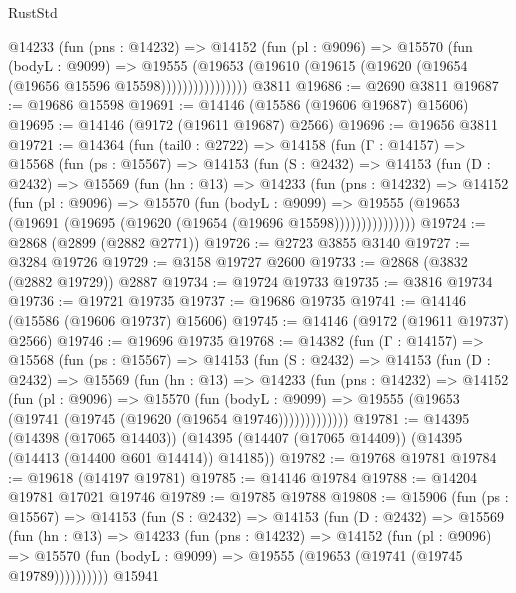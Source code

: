 \begin{lexlean}{RustStd}
\begin{coremodule}
                @14233
                  (fun (pns : @14232) =>
                  @14152
                    (fun (pl : @9096) =>
                    @15570
                      (fun (bodyL : @9099) =>
                      @19555
                        (@19653
                          (@19610 (@19615 (@19620 (@19654 (@19656 @15596 @15598))))))))))))))))
    @3811
@19686 := @2690 @3811
@19687 := @19686 @15598
@19691 := @14146 (@15586 (@19606 @19687) @15606)
@19695 := @14146 (@9172 (@19611 @19687) @2566)
@19696 := @19656 @3811
@19721 := @14364
    (fun (tail0 : @2722) =>
    @14158
      (fun (Γ : @14157) =>
      @15568
        (fun (ps : @15567) =>
        @14153
          (fun (S : @2432) =>
          @14153
            (fun (D : @2432) =>
            @15569
              (fun (hn : @13) =>
              @14233
                (fun (pns : @14232) =>
                @14152
                  (fun (pl : @9096) =>
                  @15570
                    (fun (bodyL : @9099) =>
                    @19555 (@19653 (@19691 (@19695 (@19620 (@19654 (@19696 @15598)))))))))))))))
@19724 := @2868 (@2899 (@2882 @2771))
@19726 := @2723 @3855 @3140
@19727 := @3284 @19726
@19729 := @3158 @19727 @2600
@19733 := @2868 (@3832 (@2882 @19729)) @2887
@19734 := @19724 @19733
@19735 := @3816 @19734
@19736 := @19721 @19735
@19737 := @19686 @19735
@19741 := @14146 (@15586 (@19606 @19737) @15606)
@19745 := @14146 (@9172 (@19611 @19737) @2566)
@19746 := @19696 @19735
@19768 := @14382
    (fun (Γ : @14157) =>
    @15568
      (fun (ps : @15567) =>
      @14153
        (fun (S : @2432) =>
        @14153
          (fun (D : @2432) =>
          @15569
            (fun (hn : @13) =>
            @14233
              (fun (pns : @14232) =>
              @14152
                (fun (pl : @9096) =>
                @15570
                  (fun (bodyL : @9099) =>
                  @19555 (@19653 (@19741 (@19745 (@19620 (@19654 @19746)))))))))))))
@19781 := @14395
    (@14398 (@17065 @14403))
    (@14395 (@14407 (@17065 @14409)) (@14395 (@14413 (@14400 @601 @14414)) @14185))
@19782 := @19768 @19781
@19784 := @19618 (@14197 @19781)
@19785 := @14146 @19784
@19788 := @14204 @19781 @17021 @19746
@19789 := @19785 @19788
@19808 := @15906
    (fun (ps : @15567) =>
    @14153
      (fun (S : @2432) =>
      @14153
        (fun (D : @2432) =>
        @15569
          (fun (hn : @13) =>
          @14233
            (fun (pns : @14232) =>
            @14152
              (fun (pl : @9096) =>
              @15570 (fun (bodyL : @9099) => @19555 (@19653 (@19741 (@19745 @19789))))))))))
    @15941

\end{coremodule}
\end{lexlean}
